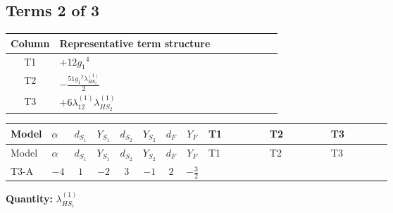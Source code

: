 \documentclass[8pt]{article}
\begin{document}
\begin{landscape}
\subsection*{Terms 2 of 3}
\begin{center}
\begin{tabular}{@{}c >{\raggedright\arraybackslash}p{0.82\linewidth}@{}}
\toprule
Column & Representative term structure \\
\midrule
T1 & \(\displaystyle +12 {g_1}^4\) \\
\midrule
T2 & \(\displaystyle -\frac{51 {g_1}^2 {\lambda_{HS_1}^{(1)}}}{2}\) \\
\midrule
T3 & \(\displaystyle +6 {\lambda_{12}^{(1)}} {\lambda_{HS_2}^{(1)}}\) \\
\midrule
\bottomrule
\end{tabular}
\end{center}
\smallskip
\tiny
\begin{longtable}{@{}llcccccc >{\raggedright\arraybackslash}p{0.21\linewidth} >{\raggedright\arraybackslash}p{0.21\linewidth} >{\raggedright\arraybackslash}p{0.21\linewidth}@{}}
\toprule
Model & $\alpha$ & $d_{S_1}$ & $Y_{S_1}$ & $d_{S_2}$ & $Y_{S_2}$ & $d_F$ & $Y_F$ & T1 & T2 & T3 \\
\midrule
\endfirsthead
\toprule
Model & $\alpha$ & $d_{S_1}$ & $Y_{S_1}$ & $d_{S_2}$ & $Y_{S_2}$ & $d_F$ & $Y_F$ & T1 & T2 & T3 \\
\midrule
\endhead
T3-A & $-4$ & $1$ & $-2$ & $3$ & $-1$ & $2$ & $-\frac{3}{2}$ & \scriptsize\adjustbox{max width=\linewidth}{$\begin{gathered} +12 {g_1}^4\end{gathered}$} & \scriptsize\adjustbox{max width=\linewidth}{$\begin{gathered} -\frac{51 {g_1}^2 {\lambda_{HS_1}^{(1)}}}{2}\end{gathered}$} & \scriptsize\adjustbox{max width=\linewidth}{$\begin{gathered} +6 {\lambda_{12}^{(1)}} {\lambda_{HS_2}^{(1)}}\end{gathered}$} \\
\midrule
\bottomrule
\end{longtable}
\clearpage
\noindent\textbf{Quantity: }$\lambda_{HS_1}^{(1)}$\par\smallskip

\end{landscape}
\end{document}
